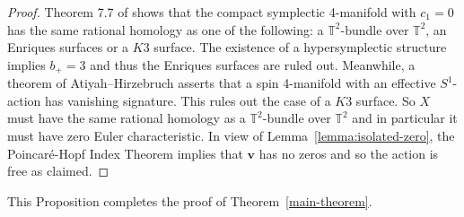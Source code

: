\documentclass[11pt]{amsart}
\theoremstyle{plain}
\newtheorem{theorem}{Theorem}
\theoremstyle{definition}
\theoremstyle{plain}
\theoremstyle{definition}
\numberwithin{equation}{section}
\numberwithin{theorem}{section}
\begin{document}
\begin{proof}

    

Theorem 7.7 of \cite{Li} shows that the compact symplectic 4-manifold with $c_1=0$ has the same rational homology as one of the following: a $\mathbb{T}^2$-bundle over $\mathbb{T}^2$, an Enriques surfaces or a $K3$ surface. The existence of a hypersymplectic structure implies $b_+=3$ and thus the Enriques surfaces are ruled out. Meanwhile, a theorem of Atiyah--Hirzebruch \cite{AH} asserts that a spin 4-manifold with an effective $S^1$-action has vanishing signature. This rules out the case of a $K3$ surface. So $X$ must have the same rational homology as a $\mathbb{T}^2$-bundle over $\mathbb{T}^2$ and in particular it must have zero Euler characteristic. In view of Lemma~\ref{lemma:isolated-zero}, the Poincar\'e-Hopf Index Theorem implies that $\bm v$ has no zeros and so the action is free as claimed.
\end{proof}

This Proposition completes the proof of Theorem~\ref{main-theorem}.
%
%
%
\end{document}
